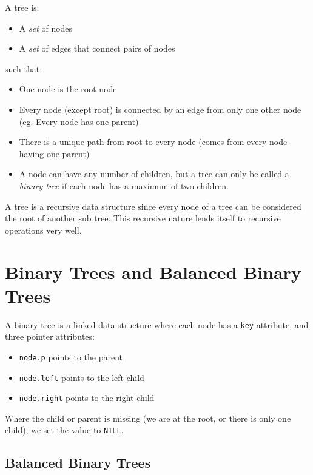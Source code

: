 A tree is:
\begin{itemize}
    \item A \emph{set} of nodes
    \item A \emph{set} of edges that connect pairs of nodes
\end{itemize}
such that:
\begin{itemize}
    \item One node is the root node
    \item Every node (except root) is connected by an edge from only one other node (eg. Every node has one parent)
    \item There is a unique path from root to every node (comes from every node having one parent)
    \item A node can have any number of children, but a tree can only be called a \emph{binary tree} if each node has a maximum of two children.
\end{itemize}

\begin{note}
    A tree is a recursive data structure since every node of a tree can be considered the root of another sub tree.
    This recursive nature lends itself to recursive operations very well.
\end{note}

\section{Binary Trees and Balanced Binary Trees}\label{sec:binary_trees_and_balanced_binary_trees}

A binary tree is a linked data structure where each node has a \texttt{key} attribute, and three pointer attributes:
\begin{itemize}
    \item \texttt{node.p} points to the parent
    \item \texttt{node.left} points to the left child
    \item \texttt{node.right} points to the right child
\end{itemize}
Where the child or parent is missing (we are at the root, or there is only one child), we set the value to \texttt{NILL}.

\subsection{Balanced Binary Trees}\label{sub:balanced_binary_trees}

